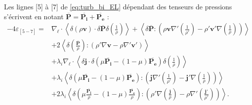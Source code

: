  Les lignes [5] à [7] de \eqref{eq:turb_bi_EL} dépendant des tenseurs de pressions s'écrivent en notant  $\overline{\boldsymbol{P}} = \overline{\boldsymbol{P_i}}+\overline{\boldsymbol{P_e}}$ :
\begin{equation}\begin{array}{rl}\label{eq:turb_bi_EL5-7}%
  - 4  \varepsilon_{[5-7]} 
  =& \nabla_{\boldsymbol{\ell}} \cdot\left<  \delta \left(\rho \boldsymbol{v}\right) \cdot \delta \overline{\boldsymbol{P}} \delta \left(\frac{1}{\rho}\right)\right> + \left<\delta \overline{\boldsymbol{P}} : \left(\rho \boldsymbol{v}  \nabla' \left(\frac{1}{\rho'}\right) - \rho' \boldsymbol{v'} \nabla \left(\frac{1}{\rho}\right)\right)\right> \\%
  &+ 2 \left<\delta \left(\frac{\overline{\boldsymbol{P}}}{\rho}\right) : \left(\rho' \nabla \boldsymbol{v}- \rho \nabla' \boldsymbol{v'} \right) \right>  \\%
  &+ \lambda_i  \nabla_{\boldsymbol{\ell}} \cdot\left<  \delta \boldsymbol{j} \cdot \delta \left(\mu\overline{\boldsymbol{P_i}}-\left(1-\mu\right) \overline{\boldsymbol{P_e}}\right)\delta \left(\frac{1}{\rho}\right)\right> \\%
  &+ \lambda_i \left<\delta \left(\mu\overline{\boldsymbol{P_i}}-\left(1-\mu\right) \overline{\boldsymbol{P_e}}\right) : \left(\boldsymbol{j}  \nabla' \left(\frac{1}{\rho'}\right) - \boldsymbol{j'} \nabla \left(\frac{1}{\rho}\right)\right)\right> \\%
  &+ 2\lambda_i\left<\delta \left(\mu\frac{\overline{\boldsymbol{P_i}}}{\rho}-\left(1-\mu\right)\frac{\overline{\boldsymbol{P_e}}}{\rho}\right) : \left(\rho' \nabla \left(  \frac{\boldsymbol{j}}{\rho}\right) - \rho \nabla' \left( \frac{\boldsymbol{j'}}{\rho'}\right) \right)\right> .
  \end{array}\end{equation}%
